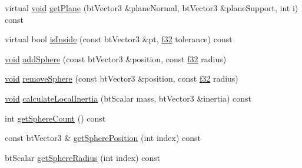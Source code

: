 \begin{DoxyCompactItemize}
virtual \mbox{\hyperlink{_thread_8h_af1e856da2e658414cb2456cb6f7ebc66}{void}} \mbox{\hyperlink{classnjli_1_1_physics_shape_multi_sphere_ae0b4b79c9708c963406aabf07e699d5b}{get\+Plane}} (bt\+Vector3 \&plane\+Normal, bt\+Vector3 \&plane\+Support, int i) const
\item 
virtual bool \mbox{\hyperlink{classnjli_1_1_physics_shape_multi_sphere_a839ea1301fdc8e1442f4ab4fb5a7cc30}{is\+Inside}} (const bt\+Vector3 \&pt, \mbox{\hyperlink{_util_8h_a5f6906312a689f27d70e9d086649d3fd}{f32}} tolerance) const
\item 
\mbox{\hyperlink{_thread_8h_af1e856da2e658414cb2456cb6f7ebc66}{void}} \mbox{\hyperlink{classnjli_1_1_physics_shape_multi_sphere_a9f72bb39a016aa5115af51a9e62638e1}{add\+Sphere}} (const bt\+Vector3 \&position, const \mbox{\hyperlink{_util_8h_a5f6906312a689f27d70e9d086649d3fd}{f32}} radius)
\item 
\mbox{\hyperlink{_thread_8h_af1e856da2e658414cb2456cb6f7ebc66}{void}} \mbox{\hyperlink{classnjli_1_1_physics_shape_multi_sphere_a3bb2481f06e880597dafdb8c9da1a54b}{remove\+Sphere}} (const bt\+Vector3 \&position, const \mbox{\hyperlink{_util_8h_a5f6906312a689f27d70e9d086649d3fd}{f32}} radius)
\item 
\mbox{\hyperlink{_thread_8h_af1e856da2e658414cb2456cb6f7ebc66}{void}} \mbox{\hyperlink{classnjli_1_1_physics_shape_multi_sphere_a27795bd39ee7a3dbde335ec454d0e1de}{calculate\+Local\+Inertia}} (bt\+Scalar mass, bt\+Vector3 \&inertia) const
\item 
int \mbox{\hyperlink{classnjli_1_1_physics_shape_multi_sphere_a3d5187930b555c1c421928e642af206b}{get\+Sphere\+Count}} () const
\item 
const bt\+Vector3 \& \mbox{\hyperlink{classnjli_1_1_physics_shape_multi_sphere_a679dc7de50f2783428f31c8be37a47c2}{get\+Sphere\+Position}} (int index) const
\item 
bt\+Scalar \mbox{\hyperlink{classnjli_1_1_physics_shape_multi_sphere_a6833432afbb47a8800e3bbd12999954a}{get\+Sphere\+Radius}} (int index) const
\end{DoxyCompactItemize}
